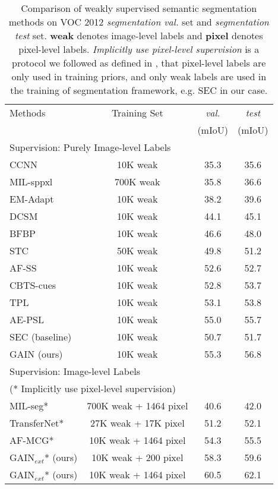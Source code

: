 \documentclass[10pt,twocolumn,letterpaper]{article}
\begin{document}
\setlength\tabcolsep{2pt}
 \begin{table}
 \small
 \begin{center}
 \begin{tabular}{lccc}
 \hline
 Methods & Training Set & \emph{val.}  &  \emph{test}\\
  & & (mIoU) & (mIoU) \\
 \hline\hline
 \multicolumn{3}{l}{Supervision: Purely Image-level Labels } \\
 CCNN \cite{pathak2015constrained} & 10K weak & 35.3 & 35.6\\
 MIL-sppxl \cite{pinheiro2015image} & 700K weak & 35.8 & 36.6\\
 EM-Adapt \cite{papandreou2015weakly} & 10K weak & 38.2 & 39.6\\
 DCSM \cite{shimoda2016distinct} & 10K weak & 44.1 & 45.1\\
 BFBP \cite{saleh2016built} & 10K weak & 46.6 & 48.0\\
 STC \cite{wei2017stc} & 50K weak & 49.8 & 51.2\\
 AF-SS \cite{qi2016augmented} & 10K weak & 52.6 & 52.7\\
 CBTS-cues \cite{roy2017combining} & 10K weak & 52.8 & 53.7\\
 TPL \cite{kim2017two} & 10K weak & 53.1 & 53.8\\
 AE-PSL \cite{wei2017object} & 10K weak & 55.0 & 55.7\\
 SEC \cite{kolesnikov2016seed} (baseline) & 10K weak & 50.7 & 51.7\\
 GAIN (ours) & 10K weak & 55.3 & 56.8\\
 \hline
 \multicolumn{3}{l}{Supervision: Image-level Labels } \\
 \multicolumn{3}{l}{(* Implicitly use pixel-level supervision)} \\
 MIL-seg* \cite{pinheiro2015image} & 700K weak + 1464 pixel & 40.6 & 42.0\\
 TransferNet* \cite{hong2016learning} & 27K weak + 17K pixel & 51.2 & 52.1\\
 AF-MCG* \cite{qi2016augmented} & 10K weak + 1464 pixel & 54.3 & 55.5\\
 GAIN$_{ext}$* (ours) & 10K weak + 200 pixel & 58.3 & 59.6\\
 GAIN$_{ext}$* (ours) & 10K weak + 1464 pixel & 60.5 & 62.1\\
 \hline
 \end{tabular}
 \end{center}
 \caption{Comparison of weakly supervised semantic segmentation methods on VOC 2012 \emph{segmentation val.} set and \emph{segmentation test} set. \textbf{weak} denotes image-level labels and \textbf{pixel} denotes pixel-level labels. \textit{Implicitly use pixel-level supervision} is a protocol we followed as defined in \cite{wei2017object}, that pixel-level labels are only used in training priors, and only weak labels are used in the training of segmentation framework, e.g. SEC \cite{kolesnikov2016seed} in our case.}
 \label{table:voc_val_test}
 \end{table}
 
\end{document}
